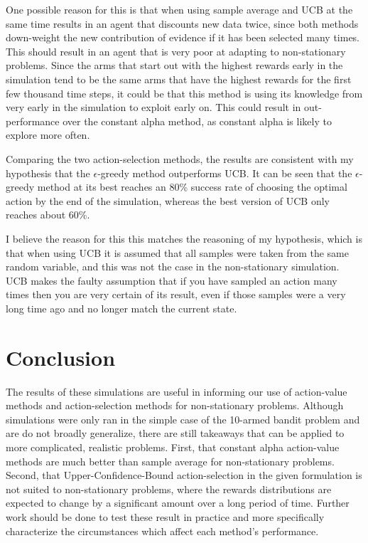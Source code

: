 \documentclass{article}
\begin{document}
One possible reason for this is that when using sample average and UCB at the same time results in an agent that discounts new data twice, since both methods down-weight the new contribution of evidence if it has been selected many times. This should result in an agent that is very poor at adapting to non-stationary problems. Since the arms that start out with the highest rewards early in the simulation tend to be the same arms that have the highest rewards for the first few thousand time steps, it could be that this method is using its knowledge from very early in the simulation to exploit early on. This could result in out-performance over the constant alpha method, as constant alpha is likely to explore more often.

Comparing the two action-selection methods, the results are consistent with my hypothesis that the $\epsilon$-greedy method outperforms UCB. It can be seen that the $\epsilon$-greedy method at its best reaches an 80\% success rate of choosing the optimal action by the end of the simulation, whereas the best version of UCB only reaches about 60\%. 

I believe the reason for this this matches the reasoning of my hypothesis, which is that when using UCB it is assumed that all samples were taken from the same random variable, and this was not the case in the non-stationary simulation. UCB makes the faulty assumption that if you have sampled an action many times then you are very certain of its result, even if those samples were a very long time ago and no longer match the current state.

\section{Conclusion}
The results of these simulations are useful in informing our use of action-value methods and action-selection methods for non-stationary problems. Although simulations were only ran in the simple case of the 10-armed bandit problem and are do not broadly generalize, there are still takeaways that can be applied to more complicated, realistic problems. First, that constant alpha action-value methods are much better than sample average for non-stationary problems. Second, that Upper-Confidence-Bound action-selection in the given formulation is not suited to non-stationary problems, where the rewards distributions are expected to change by a significant amount over a long period of time. Further work should be done to test these result in practice and more specifically characterize the circumstances which affect each method's performance.



\end{document}
